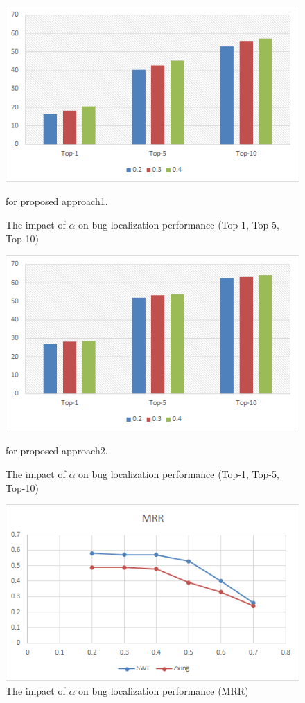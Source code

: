 \documentclass[conference]{IEEEtran}
\begin{document}
\begin{figure}
	\centering
	\includegraphics[scale=0.80]{Performance-rvsm+simi+co}
	\caption{The impact of $\alpha$ on bug localization performance (Top-1, Top-5, Top-10)} for proposed approach1.
	\label{fig:PerformanceTopK}
\end{figure}


\begin{figure}
	\centering
	\includegraphics[scale=0.80]{Performance-vsm+co}
	\caption{The impact of $\alpha$ on bug localization performance (Top-1, Top-5, Top-10)} for proposed approach2.
	\label{fig:PerformanceTopK2}
	\end{figure}

\begin{figure}
	\centering
	\includegraphics[scale=0.80]{MRR-SWT-Zxing}
	\caption{The impact of $\alpha$ on bug localization performance (MRR)}
	\label{fig:MRR}
\end{figure}
\end{document}
